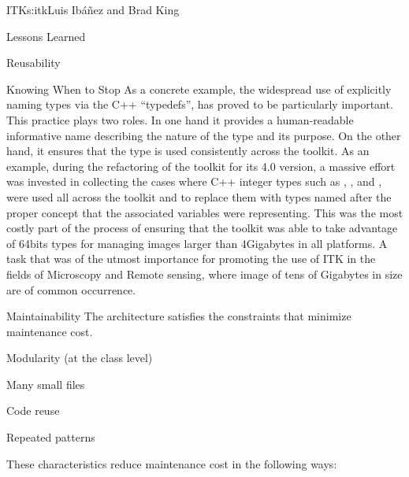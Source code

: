 \begin{aosachapter}{ITK}{s:itk}{Luis Ib\'{a}\~{n}ez and Brad King}
\begin{aosasect1}{Lessons Learned}
\begin{aosasect2}{Reusability}
\begin{aosasect3}{Knowing When to Stop}
As a concrete example, the widespread use of explicitly naming types via the C++
``typedefs'', has proved to be particularly important. This practice plays two
roles. In one hand it provides a human-readable informative name describing the
nature of the type and its purpose. On the other hand, it ensures that the type
is used consistently across the toolkit. As an example, during the refactoring
of the toolkit for its 4.0 version, a massive effort was invested in collecting
the cases where C++ integer types such as , ,
 and , were used all across the toolkit and to
replace them with types named after the proper concept that the associated
variables were representing. This was the most costly part of the process of
ensuring that the toolkit was able to take advantage of 64bits types for
managing images larger than 4Gigabytes in all platforms. A task that was of the
utmost importance for promoting the use of ITK in the fields of Microscopy and
Remote sensing, where image of tens of Gigabytes in size are of common
occurrence.
\end{aosasect3}

\end{aosasect2}

\begin{aosasect2}{Maintainability}
The architecture satisfies the constraints that minimize maintenance cost.
\begin{aosaitemize}
\item Modularity (at the class level)
\item Many small files
\item Code reuse
\item Repeated patterns
\end{aosaitemize}
\end{aosasect2}

These characteristics reduce maintenance cost in the following ways:


\end{aosasect1}
\end{aosachapter}
